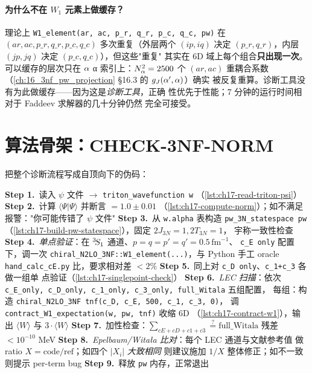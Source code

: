 \paragraph{为什么不在 \(W_1\) 元素上做缓存？}
理论上 \texttt{W1\_element(ar, ac, p\_r, q\_r, p\_c, q\_c, pw)} 在
\((ar, ac, p\_r, q\_r, p\_c, q\_c)\) 多次重复（外层两个 \((ip, iq)\) 决定
\((p\_r, q\_r)\)，内层 \((jp, jq)\) 决定 \((p\_c, q\_c)\)），但这些"重复"
其实在 6D 域上每个组合\textbf{只出现一次}。可以缓存的层次只在
\(\alpha\) α 索引上：\(N_\alpha^2 = 2500\) 个 \((ar, ac)\) 重耦合系数
（\cref{ch:16_3nf_pw_projection} §16.3 的 \(g_J(\alpha', \alpha)\)）确实
被反复重算。诊断工具没有为此做缓存——因为这是\emph{诊断工具}，正确
性优先于性能；7 分钟的运行时间相对于 Faddeev 求解器的几十分钟仍然
完全可接受。

\section{算法骨架：CHECK-3NF-NORM}
\label{sec:ch17-algorithm}

把整个诊断流程写成自顶向下的伪码：

\begin{algorithm}[H]
\SetAlgoLined
{}

\textbf{Step 1.}\ 读入 \(\psi\) 文件 \(\to\) \texttt{triton\_wavefunction w}
   （\cref{lst:ch17-read-triton-psi}）\;
\textbf{Step 2.}\ 计算 \(\langle\Psi|\Psi\rangle\) 并断言 \(=1.0 \pm 0.01\)
   （\cref{lst:ch17-compute-norm}）；如不满足报警："你可能传错了 \(\psi\) 文件"\;
\textbf{Step 3.}\ 从 \texttt{w.alpha} 表构造 \texttt{pw\_3N\_statespace pw}
   （\cref{lst:ch17-build-pw-statespace}），固定 \(2J_{3N}=1, 2T_{3N}=1\)，
   宇称一致性检查\;
\textbf{Step 4.}\ \emph{单点验证}：在 \({}^{3}\!S_{1}\) 通道、\(p=q=p'=q'=0.5\,\mathrm{fm}^{-1}\)、
   \texttt{c\_E only} 配置下，调一次
   \texttt{chiral\_N2LO\_3NF::W1\_element(...)}，与 Python 手工
   oracle \texttt{hand\_calc\_cE.py} 比，要求相对差 \(<2\%\)\;
\textbf{Step 5.}\ 同上对 \texttt{c\_D only}、\texttt{c\_1+c\_3} 各做一组单
   点验证（\cref{lst:ch17-singlepoint-check}）\;
\textbf{Step 6.}\ \emph{LEC 扫描}：依次 \texttt{c\_E\_only, c\_D\_only,
   c\_1\_only, c\_3\_only, full\_Witala} 五组配置，
   每组：构造 \texttt{chiral\_N2LO\_3NF tnf(c\_D, c\_E, 500, c\_1, c\_3, 0)}，
   调 \texttt{contract\_W1\_expectation(w, pw, tnf)} 收缩 6D
   （\cref{lst:ch17-contract-w1}），输出 \(\langle W\rangle\) 与
   \(3\cdot\langle W\rangle\)\;
\textbf{Step 7.}\ 加性检查：\(\sum_{cE+cD+c1+c3} \stackrel{?}{=} \text{full\_Witala}\)
   残差 \(<10^{-10}\) MeV\;
\textbf{Step 8.}\ \emph{Epelbaum/Witała 比对}：每个 LEC 通道与文献参考值
   做 ratio \(X = \text{code}/\text{ref}\)；如四个 \(|X_i|\) \emph{大致相同}
   则建议施加 \(1/X\) 整体修正；如不一致则提示 per-term bug\;
\textbf{Step 9.}\ 释放 \texttt{pw} 内存，正常退出\;
\caption{CHECK-3NF-NORM:\ ³H 期望值闭环}
\label{alg:ch17-check}
\end{algorithm}

